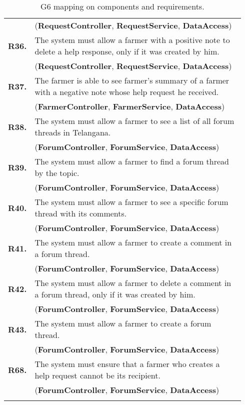 \begin{longtable}{p{0.06\linewidth} p{0.88\linewidth}}
	& (\textbf{RequestController}, \textbf{RequestService}, \textbf{DataAccess})\\
	\textbf{R36.} & The system must allow a farmer with a positive note to delete a help response, only if it was created by him.\\
	& (\textbf{RequestController}, \textbf{RequestService}, \textbf{DataAccess})\\
	\textbf{R37.} & The farmer is able to see farmer's summary of a farmer with a negative note whose help request he received. \\
	& (\textbf{FarmerController}, \textbf{FarmerService}, \textbf{DataAccess})\\
	\textbf{R38.} & The system must allow a farmer to see a list of all forum threads in Telangana.\\
	& (\textbf{ForumController}, \textbf{ForumService}, \textbf{DataAccess})\\
	\textbf{R39.} & The system must allow a farmer to find a forum thread by the topic.\\
	& (\textbf{ForumController}, \textbf{ForumService}, \textbf{DataAccess})\\
	\textbf{R40.} & The system must allow a farmer to see a specific forum thread with its comments.\\
	& (\textbf{ForumController}, \textbf{ForumService}, \textbf{DataAccess})\\
	\textbf{R41.} & The system must allow a farmer to create a comment in a forum thread.\\
	& (\textbf{ForumController}, \textbf{ForumService}, \textbf{DataAccess})\\
	\textbf{R42.} & The system must allow a farmer to delete a comment in a forum thread, only if it was created by him.\\
	& (\textbf{ForumController}, \textbf{ForumService}, \textbf{DataAccess})\\
	\textbf{R43.} & The system must allow a farmer to create a forum thread.\\
	& (\textbf{ForumController}, \textbf{ForumService}, \textbf{DataAccess})\\
	\textbf{R68.} & The system must ensure that a farmer who creates a help request cannot be its recipient.\\
	& (\textbf{ForumController}, \textbf{ForumService}, \textbf{DataAccess})\\
	
    \bottomrule
    \caption{G6 mapping on components and requirements.}
\end{longtable}





